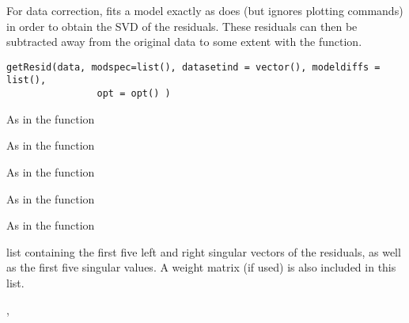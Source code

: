 \documentclass{article}
\begin{document}
\begin{Description}\relax
For data correction, fits a model exactly as does 
 (but ignores 
plotting commands) in order to obtain the SVD of the residuals.  These 
residuals can then be subtracted away from the original data to some
extent with the  function.
\end{Description}
\begin{Usage}
\begin{verbatim}
getResid(data, modspec=list(), datasetind = vector(), modeldiffs = list(), 
                opt = opt() )
\end{verbatim}
\end{Usage}
\begin{Arguments}
\begin{ldescription}
\item[\code{data}] As in the  function 
\item[\code{modspec}] As in the  function
\item[\code{datasetind}] As in the  function
\item[\code{modeldiffs}] As in the  function
\item[\code{opt}] As in the  function
\end{ldescription}
\end{Arguments}
\begin{Value}
list containing the first five left and right singular vectors of the 
residuals, as well as the first five singular values.  A weight matrix 
(if used) is also included in this list.
\end{Value}
\begin{SeeAlso}\relax
{}, 
\end{SeeAlso}
\end{document}
